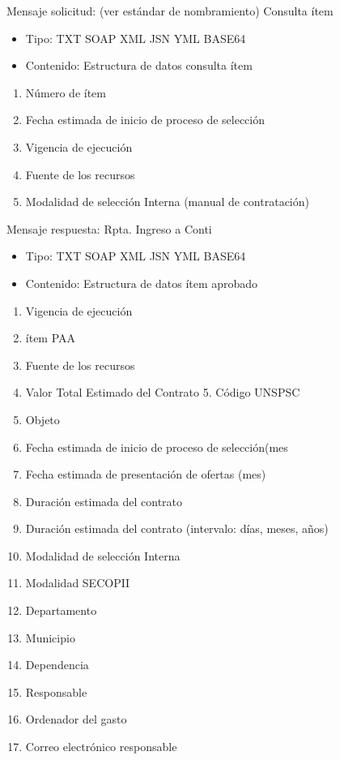 \documentclass[
  paper=a4,
  ,captions=tableheading
]{scrartcl}
\providecommand{\tightlist}{%
  \setlength{\itemsep}{0pt}\setlength{\parskip}{0pt}}
\begin{document}
Mensaje solicitud: (ver estándar de nombramiento) Consulta ítem

\begin{itemize}
\tightlist
\item
  Tipo: TXT \textbar{} SOAP \textbar{} XML \textbar{} JSN \textbar{} YML
  \textbar{} BASE64
\item
  Contenido: Estructura de datos consulta ítem
\end{itemize}

\begin{enumerate}
\def\labelenumi{\arabic{enumi}.}
\tightlist
\item
  Número de ítem
\item
  Fecha estimada de inicio de proceso de selección
\item
  Vigencia de ejecución
\item
  Fuente de los recursos
\item
  Modalidad de selección Interna (manual de contratación)
\end{enumerate}

Mensaje respuesta: Rpta. Ingreso a Conti

\begin{itemize}
\tightlist
\item
  Tipo: TXT \textbar{} SOAP \textbar{} XML \textbar{} JSN \textbar{} YML
  \textbar{} BASE64
\item
  Contenido: Estructura de datos ítem aprobado
\end{itemize}

\begin{enumerate}
\def\labelenumi{\arabic{enumi}.}
\tightlist
\item
  Vigencia de ejecución
\item
  ítem PAA
\item
  Fuente de los recursos
\item
  Valor Total Estimado del Contrato 5. Código UNSPSC
\item
  Objeto
\item
  Fecha estimada de inicio de proceso de selección(mes
\item
  Fecha estimada de presentación de ofertas (mes)
\item
  Duración estimada del contrato
\item
  Duración estimada del contrato (intervalo: días, meses, años)
\item
  Modalidad de selección Interna
\item
  Modalidad SECOPII
\item
  Departamento
\item
  Municipio
\item
  Dependencia
\item
  Responsable
\item
  Ordenador del gasto
\item
  Correo electrónico responsable
\end{enumerate}
\end{document}
